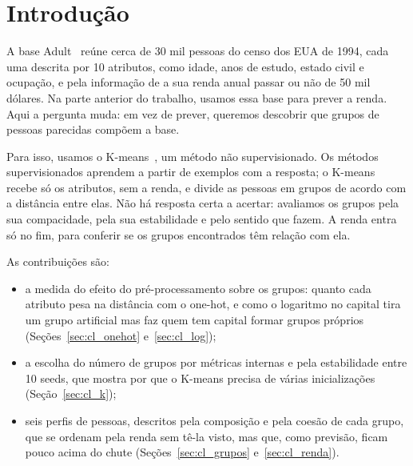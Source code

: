 \section{Introdução}

A base Adult~\cite{uci:adult,kohavi:96} reúne cerca de 30 mil pessoas do censo dos EUA de 1994, cada uma descrita por 10 atributos, como idade, anos de estudo, estado civil e ocupação, e pela informação de a sua renda anual passar ou não de 50 mil dólares. Na parte anterior do trabalho, usamos essa base para prever a renda. Aqui a pergunta muda: em vez de prever, queremos descobrir que grupos de pessoas parecidas compõem a base.

Para isso, usamos o K-means~\cite{lloyd:82,macqueen:67}, um método não supervisionado. Os métodos supervisionados aprendem a partir de exemplos com a resposta; o K-means recebe só os atributos, sem a renda, e divide as pessoas em grupos de acordo com a distância entre elas. Não há resposta certa a acertar: avaliamos os grupos pela sua compacidade, pela sua estabilidade e pelo sentido que fazem. A renda entra só no fim, para conferir se os grupos encontrados têm relação com ela.

As contribuições são:
\begin{itemize}
  \item a medida do efeito do pré-processamento sobre os grupos: quanto cada atributo pesa na distância com o one-hot, e como o logaritmo no capital tira um grupo artificial mas faz quem tem capital formar grupos próprios (Seções~\ref{sec:cl_onehot} e~\ref{sec:cl_log});
  \item a escolha do número de grupos por métricas internas e pela estabilidade entre 10 seeds, que mostra por que o K-means precisa de várias inicializações (Seção~\ref{sec:cl_k});
  \item seis perfis de pessoas, descritos pela composição e pela coesão de cada grupo, que se ordenam pela renda sem tê-la visto, mas que, como previsão, ficam pouco acima do chute (Seções~\ref{sec:cl_grupos} e~\ref{sec:cl_renda}).
\end{itemize}
